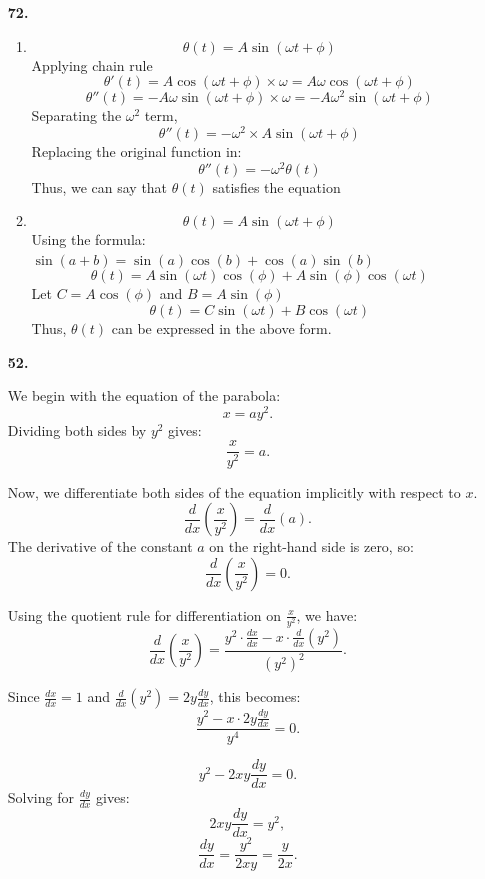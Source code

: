 \documentclass[12pt]{article}
\begin{document}
\begin{enumerate}[start=1,label={\bfseries. },leftmargin=1in]
    \item [\textbf{72.}]
    \begin{enumerate}
        \item 
        \[
        \theta(t) = A \sin(\omega t+ \phi)
        \]
        Applying chain rule
        \[
        \theta'(t) = A \cos(\omega t + \phi) \times \omega = A\omega\cos(\omega t + \phi)
        \]
        \[
        \theta''(t) = -A\omega\sin(\omega t + \phi) \times \omega = -A\omega^2\sin(\omega t + \phi)
        \]
        Separating the $\omega^2$ term,
        \[
        \theta''(t) = -\omega^2 \times A \sin(\omega t+ \phi)
        \]
        Replacing the original function in:
        \[
        \theta''(t) = -\omega^2 \theta(t)
        \]
        Thus, we can say that $\theta(t)$ satisfies the equation
        \bigbreak
        \item 
        \[
        \theta(t) = A\sin(\omega t+\phi)
        \]
        Using the formula: $\sin(a+b) = \sin(a)\cos(b) + \cos(a)\sin(b)$
        \[
        \theta(t) = A\sin(\omega t)\cos(\phi) + A\sin(\phi)\cos(\omega t)
        \]
        Let $C = A\cos(\phi)$ and $B = A\sin(\phi)$
        \[
        \theta(t) = C\sin(\omega t) + B\cos(\omega t)
        \]
        Thus, $\theta(t)$ can be expressed in the above form.
    \end{enumerate}
\bigbreak
    \item [\textbf{52.}]

    We begin with the equation of the parabola:
    \[
    x = a y^2.
    \]
    Dividing both sides by \( y^2 \) gives:
    \[
    \frac{x}{y^2} = a.
    \]

    Now, we differentiate both sides of the equation implicitly with respect to \( x \).
    \[
    \frac{d}{dx} \left( \frac{x}{y^2} \right) = \frac{d}{dx} (a).
    \]
    The derivative of the constant \( a \) on the right-hand side is zero, so:
    \[
    \frac{d}{dx} \left( \frac{x}{y^2} \right) = 0.
    \]

    Using the quotient rule for differentiation on \( \frac{x}{y^2} \), we have:
    \[
    \frac{d}{dx} \left( \frac{x}{y^2} \right) = \frac{y^2 \cdot \frac{dx}{dx} - x \cdot \frac{d}{dx} (y^2)}{(y^2)^2}.
    \]

    Since \( \frac{dx}{dx} = 1 \) and \( \frac{d}{dx}(y^2) = 2y \frac{dy}{dx} \), this becomes:
    \[
    \frac{y^2 - x \cdot 2y \frac{dy}{dx}}{y^4} = 0.
    \]

    \[
    y^2 - 2xy \frac{dy}{dx} = 0.
    \]
    Solving for \( \frac{dy}{dx} \) gives:
    \[
    2xy \frac{dy}{dx} = y^2,
    \]
    \[
    \frac{dy}{dx} = \frac{y^2}{2xy} = \frac{y}{2x}.
    \]


\end{enumerate}
\end{document}
